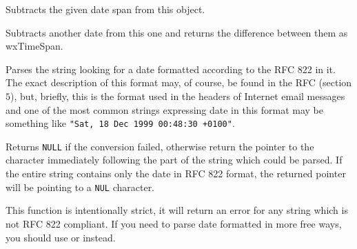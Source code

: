 \label{wxdatetimesubtractds}




Subtracts the given date span from this object.




\label{wxdatetimesubtractdt}


Subtracts another date from this one and returns the difference between them
as wxTimeSpan.



\label{wxdatetimeparserfc822date}




Parses the string  looking for a date formatted according to the RFC
822 in it. The exact description of this format may, of course, be found in
the RFC (section $5$), but, briefly, this is the format used in the headers of
Internet email messages and one of the most common strings expressing date in
this format may be something like {\tt "Sat, 18 Dec 1999 00:48:30 +0100"}.

Returns {\tt NULL} if the conversion failed, otherwise return the pointer to
the character immediately following the part of the string which could be
parsed. If the entire string contains only the date in RFC 822 format,
the returned pointer will be pointing to a {\tt NUL} character.

This function is intentionally strict, it will return an error for any string
which is not RFC 822 compliant. If you need to parse date formatted in more
free ways, you should use  or
 instead.


